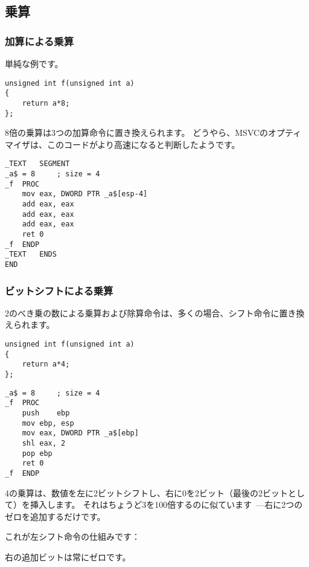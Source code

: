 ﻿\subsection{乗算}

\subsubsection{加算による乗算}

単純な例です。

\begin{lstlisting}[style=customc]
unsigned int f(unsigned int a)
{
	return a*8;
};
\end{lstlisting}

8倍の乗算は3つの加算命令に置き換えられます。
どうやら、MSVCのオプティマイザは、このコードがより高速になると判断したようです。

\begin{lstlisting}[caption=\Optimizing MSVC 2010,style=customasmx86]
_TEXT	SEGMENT
_a$ = 8		; size = 4
_f	PROC
	mov	eax, DWORD PTR _a$[esp-4]
	add	eax, eax
	add	eax, eax
	add	eax, eax
	ret	0
_f	ENDP
_TEXT	ENDS
END
\end{lstlisting}

\subsubsection{ビットシフトによる乗算}
\label{subsec:mult_using_shifts}

2のべき乗の数による乗算および除算命令は、多くの場合、シフト命令に置き換えられます。

\begin{lstlisting}[style=customc]
unsigned int f(unsigned int a)
{
	return a*4;
};
\end{lstlisting}

\begin{lstlisting}[caption=\NonOptimizing MSVC 2010,style=customasmx86]
_a$ = 8		; size = 4
_f	PROC
	push	ebp
	mov	ebp, esp
	mov	eax, DWORD PTR _a$[ebp]
	shl	eax, 2
	pop	ebp
	ret	0
_f	ENDP
\end{lstlisting}


4の乗算は、数値を左に2ビットシフトし、右に0を2ビット（最後の2ビットとして）を挿入します。
それはちょうど3を100倍するのに似ています~---右に2つのゼロを追加するだけです。

これが左シフト命令の仕組みです：



右の追加ビットは常にゼロです。

